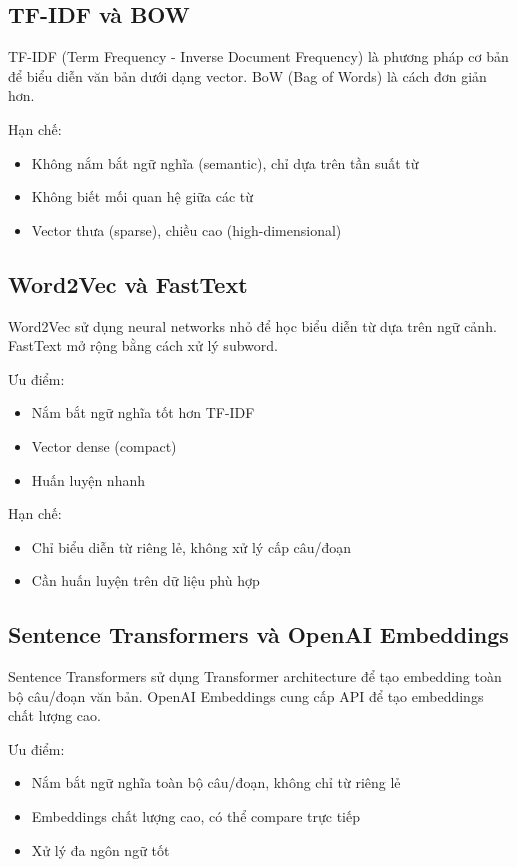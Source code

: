 \subsection{TF-IDF và BOW}

TF-IDF (Term Frequency - Inverse Document Frequency) là phương pháp cơ bản để biểu diễn văn bản dưới dạng vector. BoW (Bag of Words) là cách đơn giản hơn.

Hạn chế:
\begin{itemize}
    \item Không nắm bắt ngữ nghĩa (semantic), chỉ dựa trên tần suất từ
    \item Không biết mối quan hệ giữa các từ
    \item Vector thưa (sparse), chiều cao (high-dimensional)
\end{itemize}

\subsection{Word2Vec và FastText}

Word2Vec sử dụng neural networks nhỏ để học biểu diễn từ dựa trên ngữ cảnh. FastText mở rộng bằng cách xử lý subword.

Ưu điểm:
\begin{itemize}
    \item Nắm bắt ngữ nghĩa tốt hơn TF-IDF
    \item Vector dense (compact)
    \item Huấn luyện nhanh
\end{itemize}

Hạn chế:
\begin{itemize}
    \item Chỉ biểu diễn từ riêng lẻ, không xử lý cấp câu/đoạn
    \item Cần huấn luyện trên dữ liệu phù hợp
\end{itemize}

\subsection{Sentence Transformers và OpenAI Embeddings}

Sentence Transformers sử dụng Transformer architecture để tạo embedding toàn bộ câu/đoạn văn bản. OpenAI Embeddings cung cấp API để tạo embeddings chất lượng cao.

Ưu điểm:
\begin{itemize}
    \item Nắm bắt ngữ nghĩa toàn bộ câu/đoạn, không chỉ từ riêng lẻ
    \item Embeddings chất lượng cao, có thể compare trực tiếp
    \item Xử lý đa ngôn ngữ tốt
\end{itemize}

